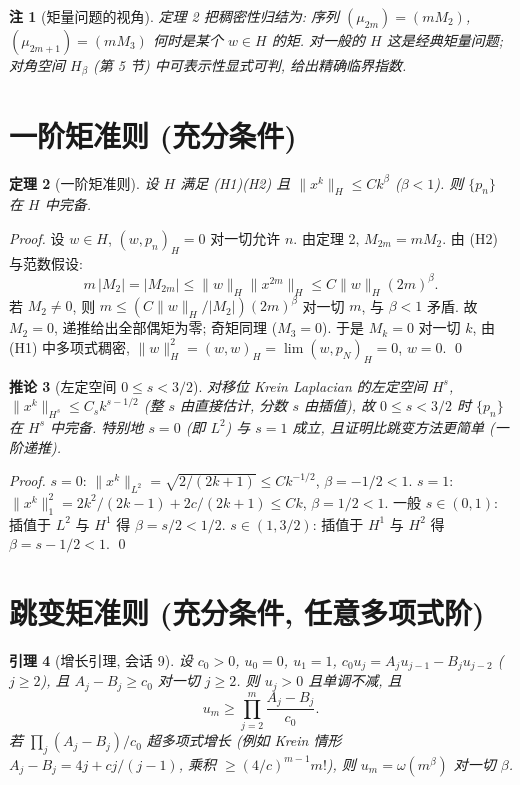 \documentclass[UTF8]{ctexart}
\newtheorem{theorem}{定理}[section]
\newtheorem{lemma}[theorem]{引理}
\newtheorem{corollary}[theorem]{推论}
\newtheorem{remark}[theorem]{注}
\begin{document}
\begin{remark}[矩量问题的视角]
	定理 2 把稠密性归结为: 序列 $(\mu_{2m}) = (mM_2)$, $(\mu_{2m+1}) = (mM_3)$
	何时是某个 $w \in H$ 的矩. 对一般的 $H$ 这是经典矩量问题; 对角空间
	$H_\beta$ (第 5 节) 中可表示性显式可判, 给出精确临界指数.
\end{remark}

\section{一阶矩准则 (充分条件)}

\begin{theorem}[一阶矩准则]
	设 $H$ 满足 (H1)(H2) 且 $\|x^k\|_H \leq C k^\beta$ ($\beta < 1$).
	则 $\{p_n\}$ 在 $H$ 中完备.
\end{theorem}

\begin{proof}
	设 $w \in H$, $(w, p_n)_H = 0$ 对一切允许 $n$. 由定理 2,
	$M_{2m} = mM_2$. 由 (H2) 与范数假设:
	\[
		m\,|M_2| = |M_{2m}| \leq \|w\|_H \|x^{2m}\|_H \leq C\|w\|_H (2m)^\beta .
	\]
	若 $M_2 \neq 0$, 则 $m \leq (C\|w\|_H/|M_2|)(2m)^\beta$ 对一切 $m$,
	与 $\beta < 1$ 矛盾. 故 $M_2 = 0$, 递推给出全部偶矩为零; 奇矩同理
	($M_3 = 0$). 于是 $M_k = 0$ 对一切 $k$, 由 (H1) 中多项式稠密,
	$\|w\|_H^2 = (w, w)_H = \lim (w, p_N)_H = 0$, $w = 0$. \qed
\end{proof}

\begin{corollary}[左定空间 $0 \leq s < 3/2$]
	对移位 Krein Laplacian 的左定空间 $H^s$, $\|x^k\|_{H^s} \leq C_s k^{s-1/2}$
	(整 $s$ 由直接估计, 分数 $s$ 由插值), 故 $0 \leq s < 3/2$ 时
	$\{p_n\}$ 在 $H^s$ 中完备. 特别地 $s = 0$ (即 $L^2$) 与 $s = 1$ 成立,
	且证明比跳变方法更简单 (一阶递推).
\end{corollary}

\begin{proof}
	$s = 0$: $\|x^k\|_{L^2} = \sqrt{2/(2k+1)} \leq C k^{-1/2}$, $\beta = -1/2 < 1$.
	$s = 1$: $\|x^k\|_1^2 = 2k^2/(2k-1) + 2c/(2k+1) \leq Ck$, $\beta = 1/2 < 1$.
	一般 $s \in (0,1)$: 插值于 $L^2$ 与 $H^1$ 得 $\beta = s/2 < 1/2$.
	$s \in (1, 3/2)$: 插值于 $H^1$ 与 $H^2$ 得 $\beta = s - 1/2 < 1$. \qed
\end{proof}

\section{跳变矩准则 (充分条件, 任意多项式阶)}

\begin{lemma}[增长引理, 会话 9]
	设 $c_0 > 0$, $u_0 = 0$, $u_1 = 1$, $c_0 u_j = A_j u_{j-1} - B_j u_{j-2}$
	($j \geq 2$), 且 $A_j - B_j \geq c_0$ 对一切 $j \geq 2$. 则 $u_j > 0$
	且单调不减, 且
	\[
		u_m \geq \prod_{j=2}^{m} \frac{A_j - B_j}{c_0} .
	\]
	若 $\prod_j (A_j - B_j)/c_0$ 超多项式增长 (例如 Krein 情形
	$A_j - B_j = 4j + cj/(j-1)$, 乘积 $\geq (4/c)^{m-1}m!$),
	则 $u_m = \omega(m^\beta)$ 对一切 $\beta$.
\end{lemma}
\end{document}
